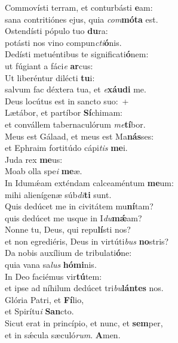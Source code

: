\evenverse Commovísti terram, et conturbásti \textbf{e}am:~\*\\
\evenverse sana contritiónes ejus, quia \textit{com}\textbf{mó}\textbf{ta} est.\\
\oddverse Ostendísti pópulo tuo \textbf{du}ra:~\*\\
\oddverse potásti nos vino compun\textit{cti}\textbf{ó}nis.\\
\evenverse Dedísti metuéntibus te significati\textbf{ó}nem:~\*\\
\evenverse ut fúgiant a fáci\textit{e} \textbf{ar}cus:\\
\oddverse Ut liberéntur dilécti \textbf{tu}i:~\*\\
\oddverse salvum fac déxtera tua, et \textit{e}\textbf{xáu}\textbf{di} me.\\
\evenverse Deus locútus est in sancto suo:~+\\
\evenverse  Lætábor, et partíbor \textbf{Sí}chimam:~\*\\
\evenverse et convállem tabernaculórum \textit{me}\textbf{tí}bor.\\
\oddverse Meus est Gálaad, et meus est Ma\textbf{nás}ses:~\*\\
\oddverse et Ephraim fortitúdo cápi\textit{tis} \textbf{me}i.\\
\evenverse Juda rex \textbf{me}us:~\*\\
\evenverse Moab olla spe\textit{i} \textbf{me}æ.\\
\oddverse In Idumǽam exténdam calceaméntum \textbf{me}um:~\*\\
\oddverse mihi alienígenæ súb\textit{di}\textbf{ti} sunt.\\
\evenverse Quis dedúcet me in civitátem mu\textbf{ní}tam?~\*\\
\evenverse quis dedúcet me usque in I\textit{du}\textbf{mǽ}am?\\
\oddverse Nonne tu, Deus, qui repu\textbf{lí}sti nos?~\*\\
\oddverse et non egrediéris, Deus in virtúti\textit{bus} \textbf{no}stris?\\
\evenverse Da nobis auxílium de tribulati\textbf{ó}ne:~\*\\
\evenverse quia vana sa\textit{lus} \textbf{hó}\textbf{mi}nis.\\
\oddverse In Deo faciémus vir\textbf{tú}tem:~\*\\
\oddverse et ipse ad níhilum dedúcet tri\textit{bu}\textbf{lán}\textbf{tes} nos.\\
\evenverse Glória Patri, et \textbf{Fí}lio,~\*\\
\evenverse et Spirítu\textit{i} \textbf{San}cto.\\
\oddverse Sicut erat in princípio, et nunc, et \textbf{sem}per,~\*\\
\oddverse et in sǽcula sæculó\textit{rum}. \textbf{A}men.\\

